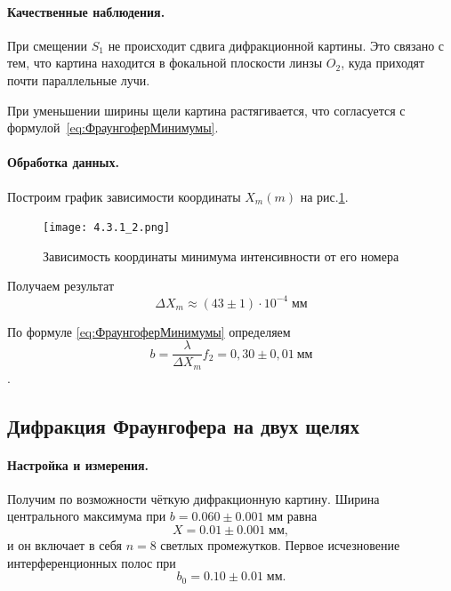 \documentclass[a4paper, 12pt]{article}
\begin{document}
\paragraph{Качественные наблюдения.}

При смещении $ S_1 $ не происходит сдвига дифракционной картины. Это связано с тем, что картина находится в фокальной плоскости линзы $ O_2 $, куда приходят почти параллельные лучи.

При уменьшении ширины щели картина растягивается, что согласуется с формулой~\eqref{eq:ФраунгоферМинимумы}.

\paragraph{Обработка данных.}

Построим график зависимости координаты $ X_m (m) $ на рис.\ref{fig:Дифрграфик}.
\begin{figure}[h!]
	\centering
	\texttt{[image: 4.3.1\_2.png]}
	\caption{Зависимость координаты минимума интенсивности от его номера}
	\label{fig:Дифрграфик}
\end{figure}

\newpage

Получаем результат
\begin{equation*}\label{key}
	\Delta X_m \approx (43\pm 1) \cdot 10^{-4} \; мм
\end{equation*}

По формуле \eqref{eq:ФраунгоферМинимумы} определяем $$b = \frac{\lambda}{\Delta X_m}f_2 = 0,30 \pm 0,01~мм$$.

\subsection{Дифракция Фраунгофера на двух щелях}

\paragraph{Настройка и измерения.}

Получим по возможности чёткую дифракционную картину. Ширина центрального максимума при $ b=0.060\pm 0.001\; мм $ равна
\begin{equation*}\label{key}
	X = 0.01\pm 0.001 \;мм,
\end{equation*}
и он включает в себя $ n = 8 $ светлых промежутков.
Первое исчезновение интерференционных полос при
\begin{equation*}\label{key}
	b_0 = 0.10 \pm 0.01 \;мм.
\end{equation*}
\end{document}
